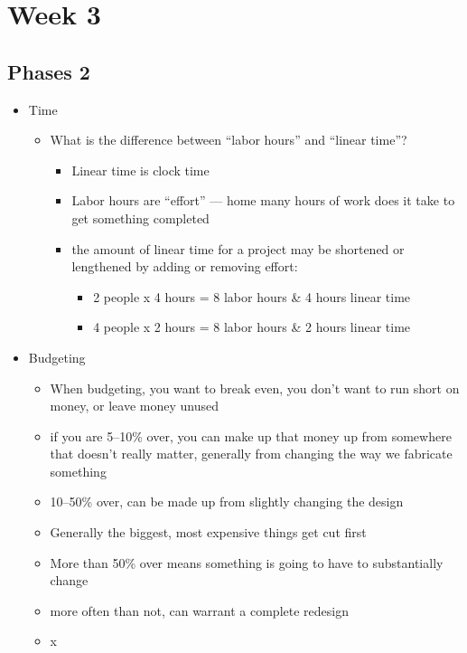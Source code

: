 \documentclass[12pt]{article}
\begin{document}
    \section{Week 3}
        \subsection{Phases 2}
            \begin{itemize}
                \item Time
                \begin{itemize}
                    \item What is the difference between ``labor hours'' and ``linear time''?
                    \begin{itemize}
                        \item Linear time is clock time
                        \item Labor hours are ``effort'' --- home many hours of work does it take to get something completed
                        \item the amount of linear time for a project may be shortened or lengthened by adding or removing effort:
                        \begin{itemize}
                            \item 2 people x 4 hours = 8 labor hours \& 4 hours linear time
                            \item 4 people x 2 hours = 8 labor hours \& 2 hours linear time
                        \end{itemize}
                    \end{itemize}
                \end{itemize}
                \item Budgeting
                \begin{itemize}
                    \item When budgeting, you want to break even, you don't want to run short on money, or leave money unused
                    \item if you are 5--10\% over, you can make up that money up from somewhere that doesn't really matter, generally from changing the way we fabricate something
                    \item 10--50\% over, can be made up from slightly changing the design
                    \item Generally the biggest, most expensive things get cut first
                    \item More than 50\% over means something is going to have to substantially change
                    \item more often than not, can warrant a complete redesign
                    \item x
                \end{itemize}
            \end{itemize}
\end{document}
